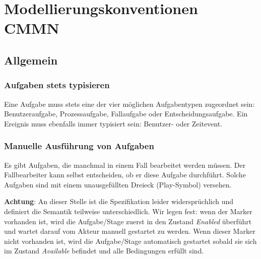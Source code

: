 \documentclass[12pt,report]{snetTeaching}
\begin{document}
\chapter{Modellierungskonventionen CMMN}




\section{Allgemein}





\subsection{Aufgaben stets typisieren}

Eine Aufgabe muss stets eine der vier möglichen Aufgabentypen zugeordnet sein: Benutzeraufgabe, Prozessaufgabe, Fallaufgabe oder Entscheidungsaufgabe. Ein Ereignis muss ebenfalls immer typisiert sein: Benutzer- oder Zeitevent.


\begin{RahmenNoFloat}
	\hfill
\end{RahmenNoFloat}




\subsection{Manuelle Ausführung von Aufgaben}

Es gibt Aufgaben, die manchmal in einem Fall bearbeitet werden müssen. Der Fallbearbeiter kann selbst entscheiden, ob er diese Aufgabe durchführt. Solche Aufgaben sind mit einem unausgefüllten Dreieck (Play-Symbol) versehen. 

\textbf{Achtung}: An dieser Stelle ist die Spezifikation leider widersprüchlich und definiert die Semantik teilweise unterschiedlich. Wir legen fest: wenn der Marker vorhanden ist, wird die Aufgabe/Stage zuerst in den Zustand \emph{Enabled} überführt und wartet darauf vom Akteur manuell gestartet zu werden. Wenn dieser Marker nicht vorhanden ist, wird die Aufgabe/Stage automatisch gestartet sobald sie sich im Zustand \emph{Available} befindet und alle Bedingungen erfüllt sind.
\end{document}
